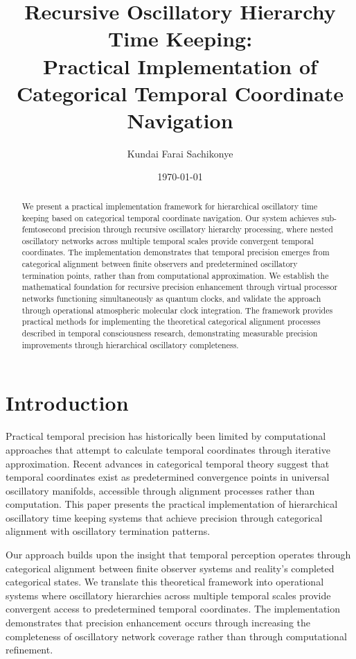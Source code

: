 \documentclass[12pt,a4paper]{article}
\title{Recursive Oscillatory Hierarchy Time Keeping: \\
Practical Implementation of Categorical Temporal Coordinate Navigation}
\author{Kundai Farai Sachikonye}
\date{\today}
\begin{document}
\maketitle

\begin{abstract}
We present a practical implementation framework for hierarchical oscillatory time keeping based on categorical temporal coordinate navigation. Our system achieves sub-femtosecond precision through recursive oscillatory hierarchy processing, where nested oscillatory networks across multiple temporal scales provide convergent temporal coordinates. The implementation demonstrates that temporal precision emerges from categorical alignment between finite observers and predetermined oscillatory termination points, rather than from computational approximation. We establish the mathematical foundation for recursive precision enhancement through virtual processor networks functioning simultaneously as quantum clocks, and validate the approach through operational atmospheric molecular clock integration. The framework provides practical methods for implementing the theoretical categorical alignment processes described in temporal consciousness research, demonstrating measurable precision improvements through hierarchical oscillatory completeness.
\end{abstract}

\section{Introduction}

Practical temporal precision has historically been limited by computational approaches that attempt to calculate temporal coordinates through iterative approximation. Recent advances in categorical temporal theory suggest that temporal coordinates exist as predetermined convergence points in universal oscillatory manifolds, accessible through alignment processes rather than computation. This paper presents the practical implementation of hierarchical oscillatory time keeping systems that achieve precision through categorical alignment with oscillatory termination patterns.

Our approach builds upon the insight that temporal perception operates through categorical alignment between finite observer systems and reality's completed categorical states. We translate this theoretical framework into operational systems where oscillatory hierarchies across multiple temporal scales provide convergent access to predetermined temporal coordinates. The implementation demonstrates that precision enhancement occurs through increasing the completeness of oscillatory network coverage rather than through computational refinement.
\end{document}
